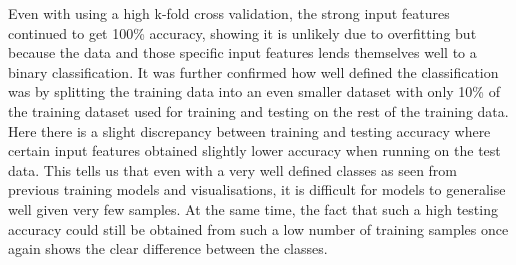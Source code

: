 \documentclass{article}
\begin{document}
\noindent
Even with using a high k-fold cross validation, the strong input features continued to get 100\% accuracy, showing it is unlikely due to overfitting but because the data and those specific input features lends themselves well to a binary classification. It was further confirmed how well defined the classification was by splitting the training data into an even smaller dataset with only 10\% of the training dataset used for training and testing on the rest of the training data. Here there is a slight discrepancy between  training and testing accuracy where certain input features obtained slightly lower accuracy when running on the test data. This tells us that even with a very well defined classes as seen from previous training models and visualisations, it is difficult for models to generalise well given very few samples. At the same time, the fact that such a high testing accuracy could still be obtained from such a low number of training samples once again shows the clear difference between the classes.
\end{document}
